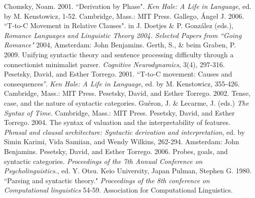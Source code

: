 \documentclass[11pt]{article}
\begin{document}
\begin{thebibliography}{9}
	Chomsky, Noam. 2001. ``Derivation by Phase". \emph{Ken Hale: A Life in Language},
    	ed. by M. Kenstowicz, 1-52. Cambridge, Mass.: MIT Press.
	Gallego, \'Angel J. 2006. ``T-to-C Movement in Relative Clauses". in J. Doetjes \&
	P. Gonz\'alez (eds.), \emph{Romance Languages and Linguistic Theory 2004. Selected Papers
	from ``Going Romance"} 2004, Amsterdam: John Benjamins.
	Gerth, S., \& beim Graben, P. 2009. Unifying syntactic theory and sentence processing difficulty
	through a connectionist minimalist parser. \emph{Cognitive Neurodynamics}, 3(4), 297-316.
    	Pesetsky, David, and Esther Torrego. 2001. ``T-to-C movement: Causes and consequences''.
	\emph{Ken Hale: A Life in Language}, ed. by M. Kenstowicz, 355-426. Cambridge, Mass.: MIT Press.
    	Pesetsky, David, and Esther Torrego. 2002. Tense, case, and the nature of syntactic categories.
	Gu\'eron, J. \& Lecarme, J. (eds.) \emph{The Syntax of Time.} Cambridge, Mass.: MIT Press.
    	Pesetsky, David, and Esther Torrego. 2004. The syntax of valuation and the interpretability
	of features. \emph{Phrasal and clausal architecture: Syntactic derivation and interpretation},
	ed. by Simin Karimi, Vida Samiian, and Wendy Wilkins, 262-294. Amsterdam: John Benjamins.
    	Pesetsky, David, and Esther Torrego. 2006. Probes, goals, and syntactic categories.
	\emph{Proceedings of the 7th Annual Conference on Psycholinguistics.}, ed. Y. Otsu. Keio University, Japan
	Pulman, Stephen G. 1980. ``Parsing and syntactic theory." \emph{Proceedings of the 8th conference
	on Computational linguistics} 54-59. Association for Computational Linguistics.
\end{thebibliography}
\end{document}
